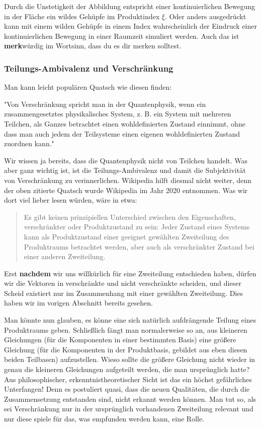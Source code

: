 \documentclass[12pt]{book}
\begin{document}
Durch die Unstetigkeit der Abbildung entspricht einer kontinuierlichen Bewegung in der Fläche ein wildes Gehüpfe im Produktindex $\xi$. Oder anders ausgedrückt kann mit einem wilden Gehüpfe in einem Index wahrscheinlich der Eindruck einer kontinuierlichen Bewegung in einer Raumzeit simuliert werden. Auch das ist \textbf{merk}würdig im Wortsinn, dass du es dir merken solltest.

\subsubsection{Teilungs-Ambivalenz und Verschränkung}

Man kann leicht populären Quatsch wie diesen finden:

"Von Verschränkung spricht man in der Quantenphysik, wenn ein zusammengesetztes physikalisches System, z. B. ein System mit mehreren Teilchen, als Ganzes betrachtet einen wohldefinierten Zustand einnimmt, ohne dass man auch jedem der Teilsysteme einen eigenen wohldefinierten Zustand zuordnen kann."

Wir wissen ja bereits, dass die Quantenphysik nicht von Teilchen handelt. Was aber ganz wichtig ist, ist die Teilungs-Ambivalenz und damit die Subjektivität von Verschränkung zu verinnerlichen. Wikipedia hilft diesmal nicht weiter, denn der oben zitierte Quatsch wurde Wikipedia im Jahr 2020 entnommen. Was wir dort viel lieber lesen würden, wäre in etwa:

\begin{quote}\begin{tcolorbox}
Es gibt keinen prinzipiellen Unterschied zwischen den Eigenschaften, verschränkter oder Produktzustand zu sein: Jeder Zustand eines Systems kann als Produktzustand einer geeignet gewählten Zweiteilung des Produktraums betrachtet werden, aber auch als verschränkter Zustand bei einer anderen Zweiteilung. \end{tcolorbox}\end{quote}
Erst \textbf{nachdem} wir uns willkürlich für eine Zweiteilung entschieden haben, dürfen wir die Vektoren in verschränkte und nicht verschränkte scheiden, und dieser Scheid existiert nur im Zusammenhang mit einer gewählten Zweiteilung. Dies haben wir im vorigen Abschnitt bereits gesehen. 

Man könnte nun glauben, es könne eine sich natürlich aufdrängende Teilung eines Produktraums geben. Schließlich fängt man normalerweise so an, aus kleineren Gleichungen (für die Komponenten in einer bestimmten Basis) eine größere Gleichung (für die Komponenten in der Produktbasis, gebildet aus eben diesen beiden Teilbasen) aufzustellen. Wieso sollte die größere Gleichung nicht wieder in genau die kleineren Gleichungen aufgeteilt werden, die man ursprünglich hatte? Aus philosophischer, erkenntnistheoretischer Sicht ist das ein höchst gefährliches Unterfangen! Denn es postuliert quasi, dass die neuen Qualitäten, die durch die Zusammensetzung entstanden sind, nicht erkannt werden können. Man tut so, als sei Verschränkung nur in der ursprünglich vorhandenen Zweiteilung relevant und nur diese spiele für das, was empfunden werden kann, eine Rolle. 
\end{document}

